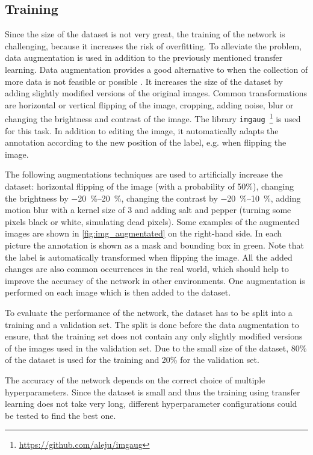 \subsection{Training}
\label{ssec:training}
Since the size of the dataset is not very great, the training of the network is challenging, because it increases the risk of overfitting.
To alleviate the problem, data augmentation is used in addition to the previously mentioned transfer learning.
Data augmentation provides a good alternative to when the collection of more data is not feasible or possible \cite{Shorten2019}.
It increases the size of the dataset by adding slightly modified versions of the original images.
Common transformations are horizontal or vertical flipping of the image, cropping, adding noise, blur or changing the brightness and contrast of the image.
The library \texttt{imgaug}~\footnote{\url{https://github.com/aleju/imgaug}} \cite{Jung2018} is used for this task.
In addition to editing the image, it automatically adapts the annotation according to the new position of the label, e.g. when flipping the image.\par
The following augmentations techniques are used to artificially increase the dataset: horizontal flipping of the image (with a probability of 50\%), changing the brightness by \SIrange{-20}{20}{\percent}, changing the contrast by \SIrange{-20}{10}{\percent}, adding motion blur with a kernel size of 3 and adding salt and pepper (turning some pixels black or white, simulating dead pixels).
Some examples of the augmented images are shown in \cref{fig:img_augmentated} on the right-hand side.
In each picture the annotation is shown as a mask and bounding box in green.
Note that the label is automatically transformed when flipping the image.
All the added changes are also common occurrences in the real world, which should help to improve the accuracy of the network in other environments.
One augmentation is performed on each image which is then added to the dataset.\par
To evaluate the performance of the network, the dataset has to be split into a training and a validation set.
The split is done before the data augmentation to ensure, that the training set does not contain any only slightly modified versions of the images used in the validation set.
Due to the small size of the dataset, 80\% of the dataset is used for the training and 20\% for the validation set.\par
The accuracy of the network depends on the correct choice of multiple hyperparameters.
Since the dataset is small and thus the training using transfer learning does not take very long, different hyperparameter configurations could be tested to find the best one.
